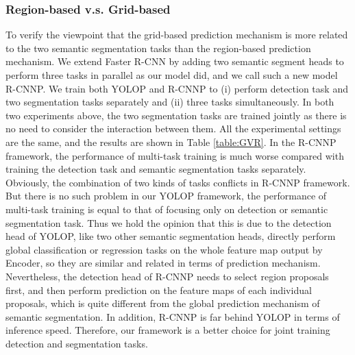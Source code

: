 \documentclass[10pt,twocolumn,letterpaper]{article}
\begin{document}
\subsubsection{Region-based v.s. Grid-based}
To verify the viewpoint that the grid-based prediction mechanism is more related to the two semantic segmentation tasks than the region-based prediction mechanism. We extend Faster R-CNN by adding two semantic segment heads to perform three tasks in parallel as our model did, and we call such a new model R-CNNP. We train both YOLOP and R-CNNP to (i) perform detection task and two segmentation tasks separately and (ii) three tasks simultaneously. In both two experiments above, the two segmentation tasks are trained jointly as there is no need to consider the interaction between them. All the experimental settings are the same, and the results are shown in Table \ref{table:GVR}. In the R-CNNP framework, the performance of multi-task training is much worse compared with training the detection task and semantic segmentation tasks separately. Obviously, the combination of two kinds of tasks conflicts in R-CNNP framework. But there is no such problem in our YOLOP framework, the performance of multi-task training is equal to that of focusing only on detection or semantic segmentation task. Thus we hold the opinion that this is due to the detection head of YOLOP, like two other semantic segmentation heads, directly perform global classification or regression tasks on the whole feature map output by Encoder, so they are similar and related in terms of prediction mechanism. Nevertheless, the detection head of R-CNNP needs to select region proposals first, and then perform prediction on the feature maps of each individual proposals, which is quite different from the global prediction mechanism of semantic segmentation. In addition, R-CNNP is far behind YOLOP in terms of inference speed. Therefore, our framework is a better choice for joint training detection and segmentation tasks. 


\begin{table*}
\begin{center}
\end{center}
\caption{Panoptic driving perception results: multi-task learning v.s. single task learning.}
\label{table:MVS}
\end{table*}
\end{document}
